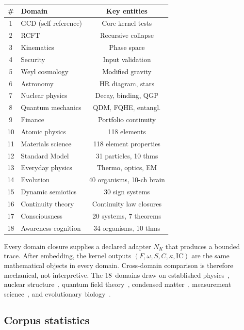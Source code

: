 \documentclass[
  aps,
  prd,
  twocolumn,
  superscriptaddress,
  nofootinbib,
  floatfix
]{revtex4-2}
\newcommand{\IC}{\mathrm{IC}}
\begin{document}
\begin{center}
\begin{tabular}{@{}clc@{}}
\toprule
\# & Domain & Key entities \\
\midrule
1 & GCD (self-reference) & Core kernel tests \\
2 & RCFT & Recursive collapse \\
3 & Kinematics & Phase space \\
4 & Security & Input validation \\
5 & Weyl cosmology & Modified gravity \\
6 & Astronomy & HR diagram, stars \\
7 & Nuclear physics & Decay, binding, QGP \\
8 & Quantum mechanics & QDM, FQHE, entangl. \\
9 & Finance & Portfolio continuity \\
10 & Atomic physics & 118 elements \\
11 & Materials science & 118 element properties \\
12 & Standard Model & 31 particles, 10 thms \\
13 & Everyday physics & Thermo, optics, EM \\
14 & Evolution & 40 organisms, 10-ch brain \\
15 & Dynamic semiotics & 30 sign systems \\
16 & Continuity theory & Continuity law closures \\
17 & Consciousness & 20 systems, 7 theorems \\
18 & Awareness-cognition & 34 organisms, 10 thms \\
\bottomrule
\end{tabular}
\end{center}

Every domain closure supplies a declared adapter $N_K$ that
produces a bounded trace.  After embedding, the kernel outputs
$(F, \omega, S, C, \kappa, \IC)$ are the same mathematical objects
in every domain.  Cross-domain comparison is therefore mechanical,
not interpretive.  The 18~domains draw on established
physics~\cite{pdg2024,goldstein2002classical,landau1976mechanics,misner1973gravitation},
nuclear structure~\cite{weizsacker1935,bethe1936},
quantum field theory~\cite{gross1973,politzer1973,higgs1964,wilson1974confinement},
condensed matter~\cite{laughlin1983fqhe,kitaev2003toric},
measurement science~\cite{jcgm2008gum},
and evolutionary biology~\cite{darwin1859origin}.

\subsection{Corpus statistics}
\end{document}
